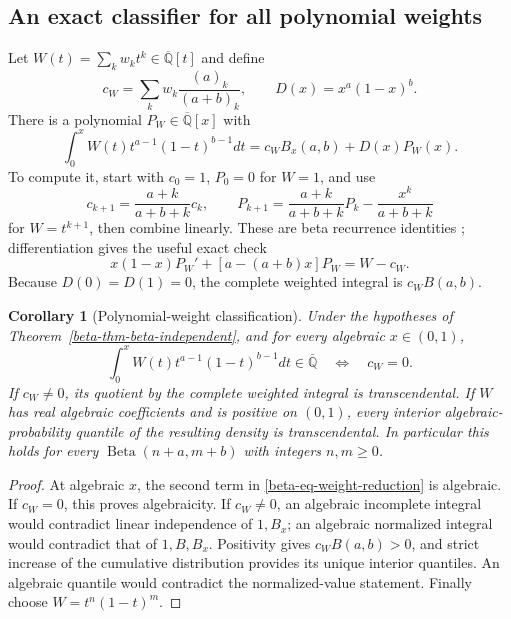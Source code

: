 \documentclass[11pt,a4paper]{article}
\newtheorem{corollary}[theorem]{Corollary}
\theoremstyle{definition}
\theoremstyle{remark}
\numberwithin{equation}{section}
\begin{document}
\subsection{An exact classifier for all polynomial weights}

Let $W(t)=\sum_k w_kt^k\in\overline{\mathbb Q}[t]$ and define
\begin{equation}\label{beta-eq-weight-coefficient}
c_W=\sum_k w_k\frac{(a)_k}{(a+b)_k},\qquad
D(x)=x^a(1-x)^b.
\end{equation}
There is a polynomial $P_W\in\overline{\mathbb Q}[x]$ with
\begin{equation}\label{beta-eq-weight-reduction}
\int_0^x W(t)t^{a-1}(1-t)^{b-1}dt
=c_WB_x(a,b)+D(x)P_W(x).
\end{equation}
To compute it, start with $c_0=1$, $P_0=0$ for $W=1$, and use
\[
c_{k+1}=\frac{a+k}{a+b+k}c_k,\qquad
P_{k+1}=\frac{a+k}{a+b+k}P_k-\frac{x^k}{a+b+k}
\]
for $W=t^{k+1}$, then combine linearly.  These are beta recurrence
identities \cite{beta-dlmf}; differentiation gives the useful exact
check
\begin{equation}\label{beta-eq-weight-ode}
x(1-x)P_W'+[a-(a+b)x]P_W=W-c_W.
\end{equation}
Because $D(0)=D(1)=0$, the complete weighted integral is $c_WB(a,b)$.

\begin{corollary}[Polynomial-weight classification]
\label{beta-cor-weight}
Under the hypotheses of Theorem~\ref{beta-thm-beta-independent}, and
for every algebraic $x\in(0,1)$,
\[
\int_0^xW(t)t^{a-1}(1-t)^{b-1}dt\in\overline{\mathbb Q}
\quad\Longleftrightarrow\quad c_W=0.
\]
If $c_W\ne0$, its quotient by the complete weighted integral is
transcendental.  If $W$ has real algebraic coefficients and is positive
on $(0,1)$, every interior algebraic-probability quantile of the
resulting density is transcendental.  In particular this holds for
every $\operatorname{Beta}(n+a,m+b)$ with integers $n,m\ge0$.
\end{corollary}

\begin{proof}
At algebraic $x$, the second term in
\eqref{beta-eq-weight-reduction} is algebraic.  If $c_W=0$, this proves
algebraicity.  If $c_W\ne0$, an algebraic incomplete integral would
contradict linear independence of $1,B_x$; an algebraic normalized
integral would contradict that of $1,B,B_x$.  Positivity gives
$c_WB(a,b)>0$, and strict increase of the cumulative distribution
provides its unique interior quantiles.  An algebraic quantile would
contradict the normalized-value statement.  Finally choose
$W=t^n(1-t)^m$.
\end{proof}
\end{document}
